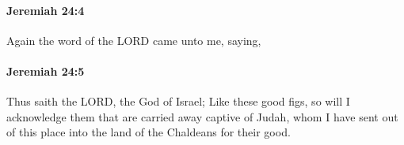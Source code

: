 		\paragraph{Jeremiah 24:4} %
			\label{JEREMIAH-24-4}

			Again the word of the LORD came unto me, saying,


		\paragraph{Jeremiah 24:5} %
			\label{JEREMIAH-24-5}

			Thus saith the LORD, the God of Israel; Like these good figs, so will I acknowledge them that are carried away captive of Judah, whom I have sent out of this place into the land of the Chaldeans for their good.


